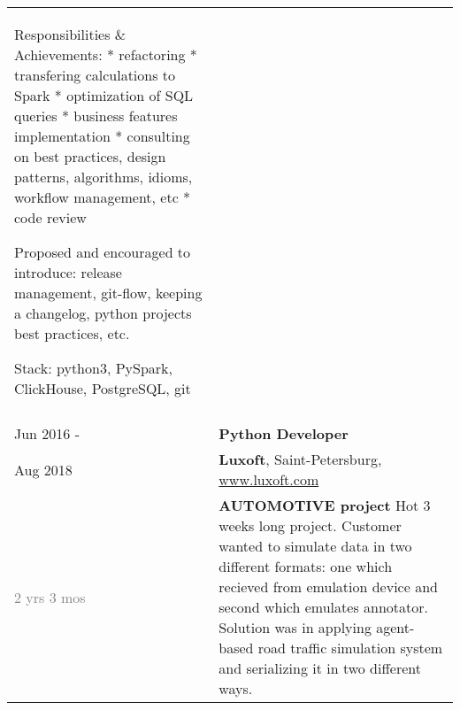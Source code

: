 \documentclass[a4paper,10pt]{article}
\begin{document}
\begin{tabularx}{\textwidth}{lX}
{                                    Responsibilities \& Achievements:\newline
                                    * refactoring\newline
                                    * transfering calculations to Spark\newline
                                    * optimization of SQL queries\newline
                                    * business features implementation\newline
                                    * consulting on best practices, design patterns, algorithms, idioms, workflow management, etc\newline
                                    * code review\newline

                                    Proposed and encouraged to introduce: release management, git-flow, keeping a changelog, python projects best practices, etc.\newline

                                    Stack: python3, PySpark, ClickHouse, PostgreSQL, git
                                } \\

\multicolumn{2}{c}{}\\
\pagebreak
\noindent

    Jun 2016 -              &   \textbf{Python Developer} \\
    Aug 2018                &   \textbf{Luxoft}, Saint-Petersburg,
                                \href{www.luxoft.com}{www.luxoft.com} \\
    \textcolor{gray}
    {2 yrs 3 mos}   
                            &   \footnotesize{

                                    \textbf{AUTOMOTIVE project}\newline
                                    Hot 3 weeks long project.\newline
                                    Customer wanted to simulate data in two different formats: one which recieved from emulation device and second which emulates annotator.\newline
                                    Solution was in applying agent-based road traffic simulation system and serializing it in two different ways.\newline
                                    
}
\end{tabularx}
\end{document}
